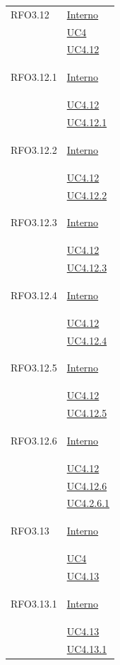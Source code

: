 \begin{longtable}{|>{\centering}m{5cm}|m{5cm}<{\centering}|}
\hypertarget{RFO3.12}{RFO3.12} &  \hyperlink{Interno}{Interno}\\
&\hyperref[UC4]{UC4}\\
&\hyperref[UC4.12]{UC4.12}\\ \hline

\hypertarget{RFO3.12.1}{RFO3.12.1} & \hyperlink{Interno}{Interno}\\
&\hyperref[UC4.12]{UC4.12}\\
&\hyperref[UC4.12.1]{UC4.12.1}\\ \hline

\hypertarget{RFO3.12.2}{RFO3.12.2} & \hyperlink{Interno}{Interno}\\
&\hyperref[UC4.12]{UC4.12}\\
&\hyperref[UC4.12.2]{UC4.12.2}\\ \hline

\hypertarget{RFO3.12.3}{RFO3.12.3} & \hyperlink{Interno}{Interno}\\
&\hyperref[UC4.12]{UC4.12}\\
&\hyperref[UC4.12.3]{UC4.12.3}\\ \hline

\hypertarget{RFO3.12.4}{RFO3.12.4} & \hyperlink{Interno}{Interno}\\
&\hyperref[UC4.12]{UC4.12}\\
&\hyperref[UC4.12.4]{UC4.12.4}\\ \hline

\hypertarget{RFO3.12.5}{RFO3.12.5} & \hyperlink{Interno}{Interno}\\
&\hyperref[UC4.12]{UC4.12}\\
&\hyperref[UC4.12.5]{UC4.12.5}\\ \hline

\hypertarget{RFO3.12.6}{RFO3.12.6} & \hyperlink{Interno}{Interno}\\
&\hyperref[UC4.12]{UC4.12}\\
&\hyperref[UC4.12.6]{UC4.12.6}\\ 
&\hyperref[UC4.2.6.1]{UC4.2.6.1}\\ \hline

\hypertarget{RFO3.13}{RFO3.13} & \hyperlink{Interno}{Interno}\\
&\hyperref[UC4]{UC4}\\
&\hyperref[UC4.13]{UC4.13}\\ \hline

\hypertarget{RFO3.13.1}{RFO3.13.1} & \hyperlink{Interno}{Interno}\\
&\hyperref[UC4.13]{UC4.13}\\
&\hyperref[UC4.13.1]{UC4.13.1}\\ \hline


\end{longtable}
